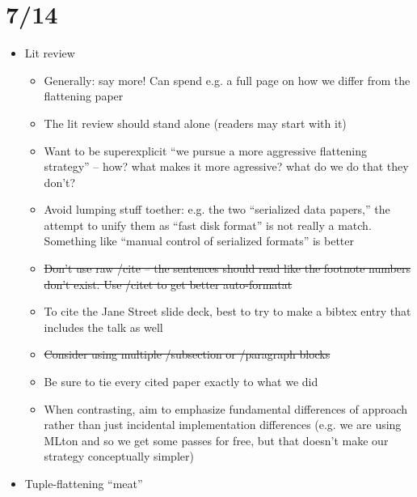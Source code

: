 \section{7/14}
\begin{itemize}
\item Lit review

  \begin{itemize}

  \item Generally: say more! Can spend e.g. a full page on how we differ from
    the flattening paper

  \item The lit review should stand alone (readers may start with it)

  \item Want to be superexplicit ``we pursue a more aggressive flattening
    strategy'' -- how? what makes it more agressive? what do we do that they
    don't?

  \item Avoid lumping stuff toether: e.g. the two ``serialized data papers,''
    the attempt to unify them as ``fast disk format'' is not really a match.
    Something like ``manual control of serialized formats'' is better

  \item \st{Don't use raw /cite -- the sentences should read like the footnote
    numbers don't exist. Use /citet to get better auto-formatat}

  \item To cite the Jane Street slide deck, best to try to make a bibtex entry
    that includes the talk as well

  \item \st{Consider using multiple /subsection or /paragraph blocks}

  \item Be sure to tie every cited paper exactly to what we did

  \item When contrasting, aim to emphasize fundamental differences of approach
    rather than just incidental implementation differences (e.g. we are using
    MLton and so we get some passes for free, but that doesn't make our strategy
    conceptually simpler)

  \end{itemize}

\item Tuple-flattening ``meat''

  \begin{itemize}


\end{itemize}
\end{itemize}
